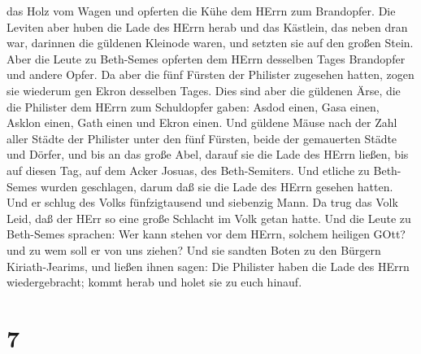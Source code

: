 das Holz vom Wagen und opferten die Kühe dem HErrn zum Brandopfer.
 Die Leviten aber huben die Lade des HErrn herab und das
Kästlein, das neben dran war, darinnen die güldenen Kleinode waren, und
setzten sie auf den großen Stein. Aber die Leute zu Beth-Semes opferten
dem HErrn desselben Tages Brandopfer und andere Opfer.  Da
aber die fünf Fürsten der Philister zugesehen hatten, zogen sie wiederum
gen Ekron desselben Tages.  Dies sind aber die güldenen
Ärse, die die Philister dem HErrn zum Schuldopfer gaben: Asdod einen,
Gasa einen, Asklon einen, Gath einen und Ekron einen.  Und
güldene Mäuse nach der Zahl aller Städte der Philister unter den fünf
Fürsten, beide der gemauerten Städte und Dörfer, und bis an das große
Abel, darauf sie die Lade des HErrn ließen, bis auf diesen Tag, auf dem
Acker Josuas, des Beth-Semiters.  Und etliche zu Beth-Semes
wurden geschlagen, darum daß sie die Lade des HErrn gesehen hatten. Und
er schlug des Volks fünfzigtausend und siebenzig Mann. Da trug das Volk
Leid, daß der HErr so eine große Schlacht im Volk getan hatte.
 Und die Leute zu Beth-Semes sprachen: Wer kann stehen vor
dem HErrn, solchem heiligen GOtt? und zu wem soll er von uns ziehen?
 Und sie sandten Boten zu den Bürgern Kiriath-Jearims, und
ließen ihnen sagen: Die Philister haben die Lade des HErrn
wiedergebracht; kommt herab und holet sie zu euch hinauf.

\hypertarget{section-6}{%
\section{7}\label{section-6}}

